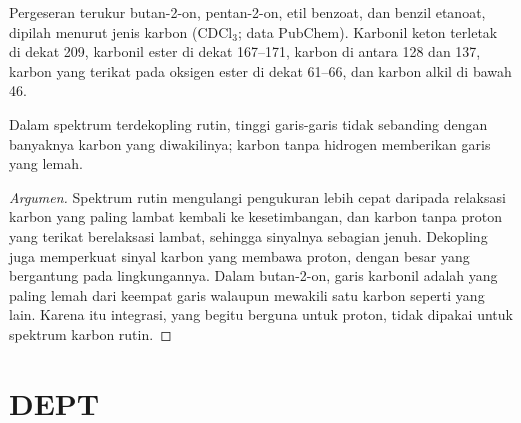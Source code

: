 \begin{omfigure}

{\small Pergeseran  terukur butan-2-on, pentan-2-on, etil benzoat,
dan benzil etanoat, dipilah menurut jenis karbon (CDCl$_3$; data PubChem).
Karbonil keton terletak di dekat 209, karbonil ester di dekat
167--171, karbon  di antara 128 dan 137, karbon yang terikat pada
oksigen ester di dekat 61--66, dan karbon alkil di bawah 46.}
\end{omfigure}

\begin{proposition}\label{prop:b2:structure-determination:intensities}
Dalam spektrum  terdekopling rutin, tinggi garis-garis tidak
sebanding dengan banyaknya karbon yang diwakilinya; karbon tanpa hidrogen
memberikan garis yang lemah.
\end{proposition}

\begin{proof}[Argumen]
Spektrum rutin mengulangi pengukuran lebih cepat daripada relaksasi karbon
yang paling lambat kembali ke kesetimbangan, dan karbon tanpa proton yang
terikat berelaksasi lambat, sehingga sinyalnya sebagian jenuh. Dekopling
juga memperkuat sinyal karbon yang membawa proton, dengan besar yang
bergantung pada lingkungannya. Dalam butan-2-on, garis karbonil adalah yang
paling lemah dari keempat garis walaupun mewakili satu karbon seperti yang
lain. Karena itu integrasi, yang begitu berguna untuk proton, tidak dipakai
untuk spektrum karbon rutin.
\end{proof}

\section{DEPT}

